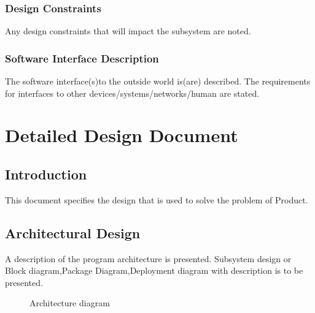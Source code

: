 \documentclass[oneside,a4paper,12pt]{report}
\begin{document}
 \subsection{Design Constraints}	
Any design constraints that will impact the subsystem are noted.
 \subsection{Software Interface Description}	 
The software interface(s)to the outside world is(are) described.
The requirements for interfaces to other devices/systems/networks/human are stated.



\chapter{Detailed Design Document }
 \section{Introduction}  
This document specifies the design that is used to solve the problem of Product.  
\section{Architectural Design}  
	A description of the program architecture is presented. Subsystem design or Block diagram,Package Diagram,Deployment diagram with description is to be presented.

 
  \begin{center}
	\begin{figure}[!htbp]
		\centering
	  \caption{Architecture diagram}
	  \label{fig:arch-dig}
	\end{figure}
\end{center} 
\end{document}
